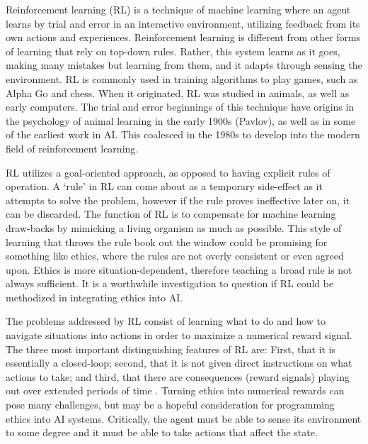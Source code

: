 \documentclass{svproc}
\begin{document}
Reinforcement learning (RL) is a technique of machine learning where an agent learns by trial and error in an interactive environment, utilizing feedback from its own actions and experiences. \cite{Bhatt2018Reinforcement101} Reinforcement learning is different from other forms of learning that rely on top-down rules. Rather, this system learns as it goes, making many mistakes but learning from them, and it adapts through sensing the environment. RL is commonly used in training algorithms to play games, such as Alpha Go and chess. When it originated, RL was studied in animals, as well as early computers. The trial and error beginnings of this technique have origins in the psychology of animal learning in the early 1900s (Pavlov), as well as in some of the earliest work in AI. This coalesced in the 1980s to develop into the modern field of reinforcement learning. \cite{Sutton2018ReinforcementEdition}

RL utilizes a goal-oriented approach, as opposed to having explicit rules of operation. A ‘rule’ in RL can come about as a temporary side-effect as it attempts to solve the problem, however if the rule proves ineffective later on, it can be discarded. The function of RL is to compensate for machine learning draw-backs by mimicking a living organism as much as possible. \cite{Vachnadze2021ReinforcementMachines.}  This style of learning that throws the rule book out the window could be promising for something like ethics, where the rules are not overly consistent or even agreed upon. Ethics is more situation-dependent, therefore teaching a broad rule is not always sufficient. It is a worthwhile investigation to question if RL could be methodized in integrating ethics into AI. 

The problems addressed by RL consist of learning what to do and how to navigate situations into actions in order to maximize a numerical reward signal. The three most important distinguishing features of RL are: First, that it is essentially a closed-loop; second, that it is not given direct instructions on what actions to take; and third, that there are consequences (reward signals) playing out over extended periods of time \cite{Sutton2018ReinforcementEdition}.
Turning ethics into numerical rewards can pose many challenges, but may be a hopeful consideration for programming ethics into AI systems. Critically, the agent must be able to sense its environment to some degree and it must be able to take actions that affect the state. \cite{Sutton2018ReinforcementEdition}
\end{document}
